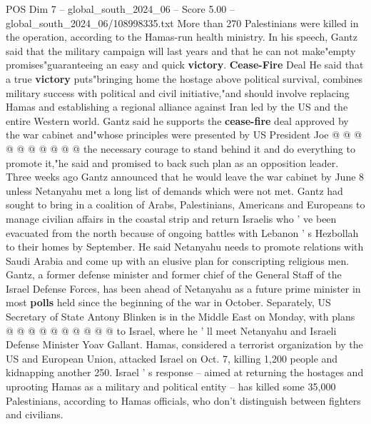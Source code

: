 \begin{textsample}{POS Dim 7 – global\_south\_2024\_06 – Score 5.00 – global\_south\_2024\_06/108998335.txt}
More than 270 Palestinians were killed in the operation, according to the Hamas-run health ministry.
In his speech, Gantz said that the military campaign will last years and that he can not make"empty promises"guaranteeing an easy and quick \textbf{victory}. \textbf{Cease-Fire} Deal He said that a true \textbf{victory} puts"bringing home the hostage above political survival, combines military success with political and civil initiative,"and should involve replacing Hamas and establishing a regional alliance against Iran led by the US and the entire Western world.
Gantz said he supports the \textbf{cease-fire} deal approved by the war cabinet and"whose principles were presented by US President Joe @ @ @ @ @ @ @ @ @ @ the necessary courage to stand behind it and do everything to promote it,"he said and promised to back such plan as an opposition leader.
Three weeks ago Gantz announced that he would leave the war cabinet by June 8 unless Netanyahu met a long list of demands which were not met.
Gantz had sought to bring in a coalition of Arabs, Palestinians, Americans and Europeans to manage civilian affairs in the coastal strip and return Israelis who ' ve been evacuated from the north because of ongoing battles with Lebanon ' s Hezbollah to their homes by September.
He said Netanyahu needs to promote relations with Saudi Arabia and come up with an elusive plan for conscripting religious men.
Gantz, a former defense minister and former chief of the General Staff of the Israel Defense Forces, has been ahead of Netanyahu as a future prime minister in most \textbf{polls} held since the beginning of the war in October.
Separately, US Secretary of State Antony Blinken is in the Middle East on Monday, with plans @ @ @ @ @ @ @ @ @ @ to Israel, where he ' ll meet Netanyahu and Israeli Defense Minister Yoav Gallant.
Hamas, considered a terrorist organization by the US and European Union, attacked Israel on Oct. 7, killing 1,200 people and kidnapping another 250.
Israel ' s response -- aimed at returning the hostages and uprooting Hamas as a military and political entity -- has killed some 35,000 Palestinians, according to Hamas officials, who don't distinguish between fighters and civilians.

\end{textsample}
